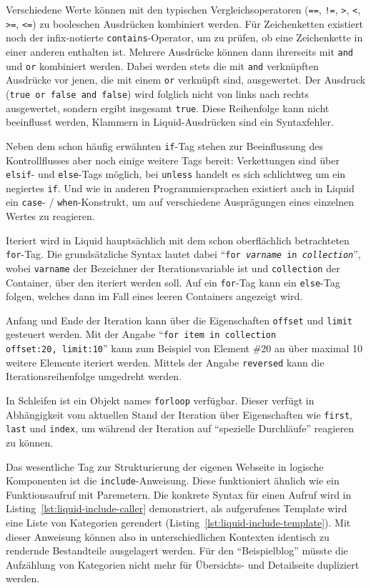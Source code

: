 Verschiedene Werte können mit den typischen Vergleichsoperatoren (\texttt{==}, \texttt{!=}, \texttt{>}, \texttt{<}, \texttt{>=}, \texttt{<=}) zu booleschen Ausdrücken kombiniert werden. Für Zeichenketten existiert noch der infix-notierte \texttt{contains}-Operator, um zu prüfen, ob eine Zeichenkette in einer anderen enthalten ist. Mehrere Ausdrücke können dann ihrerseits  mit \texttt{and} und \texttt{or} kombiniert werden. Dabei werden stets die mit \texttt{and} verknüpften Ausdrücke vor jenen, die mit einem \texttt{or} verknüpft sind, ausgewertet. Der Ausdruck (\texttt{true or false and false}) wird folglich nicht von links nach rechts ausgewertet, sondern ergibt insgesamt \texttt{true}. Diese Reihenfolge kann nicht beeinflusst werden, Klammern in Liquid-Ausdrücken sind ein Syntaxfehler.

Neben dem schon häufig erwähnten \texttt{if}-Tag stehen zur Beeinflussung des Kontrollflusses aber noch einige weitere Tags bereit: Verkettungen sind über \texttt{elsif}- und \texttt{else}-Tags möglich, bei \texttt{unless} handelt es sich schlichtweg um ein negiertes \texttt{if}. Und wie in anderen Programmiersprachen existiert auch in Liquid ein \texttt{case}- / \texttt{when}-Konstrukt, um auf verschiedene Ausprägungen eines einzelnen Wertes zu reagieren.

Iteriert wird in Liquid hauptsächlich mit dem schon oberflächlich betrachteten \texttt{for}-Tag. Die grundsätzliche Syntax lautet dabei "`\texttt{for~\textit{varname}~in~\textit{collection}}"', wobei \texttt{varname} der Bezeichner der Iterationsvariable ist und \texttt{collection} der Container, über den iteriert werden soll. Auf ein \texttt{for}-Tag kann ein \texttt{else}-Tag folgen, welches dann im Fall eines leeren Containers angezeigt wird.

Anfang und Ende der Iteration kann über die Eigenschaften \texttt{offset} und \texttt{limit} gesteuert werden. Mit der Angabe "`\texttt{for item in collection offset:20,~limit:10}"' kann zum Beispiel von Element \#20 an über maximal 10 weitere Elemente iteriert werden. Mittels der Angabe \texttt{reversed} kann die Iterationsreihenfolge umgedreht werden.

In Schleifen ist ein Objekt names \texttt{forloop} verfügbar. Dieser verfügt in Abhängigkeit vom aktuellen Stand der Iteration über Eigenschaften wie \texttt{first}, \texttt{last} und \texttt{index}, um während der Iteration auf "`spezielle Durchläufe"' reagieren zu können.

Das wesentliche Tag zur Strukturierung der eigenen Webseite in logische Komponenten ist die \texttt{include}-Anweisung. Diese funktioniert ähnlich wie ein Funktionsaufruf mit Paremetern. Die konkrete Syntax für einen Aufruf wird in Listing~\ref{lst:liquid-include-caller} demonstriert, als aufgerufenes Template wird eine Liste von Kategorien gerendert (Listing~\ref{lst:liquid-include-template}). Mit dieser Anweisung können also in unterschiedlichen Kontexten identisch zu rendernde Bestandteile ausgelagert werden. Für den "`Beispielblog"' müsste die Aufzählung von Kategorien nicht mehr für Übersichts- und Detailseite dupliziert werden.

